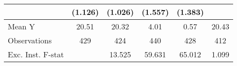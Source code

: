 {\begin{tabular}{l*{5}{c}}
            &     (1.126)         &     (1.026)         &     (1.557)         &     (1.383)         &                     \\
\midrule
Mean Y      &       20.51         &       20.32         &        4.01         &        0.57         &       20.43         \\
Observations&         429         &         424         &         440         &         428         &         412         \\
Exc. Inst. F-stat&                     &      13.525         &      59.631         &      65.012         &       1.099         \\
\bottomrule
\end{tabular}
}
